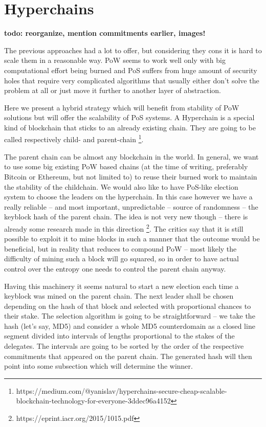 \section{Hyperchains}

\textbf{todo: reorganize, mention commitments earlier, images!}

The previous approaches had a lot to offer, but considering they cons it is hard
to scale them in a reasonable way. PoW seems to work well only with big
computational effort being burned and PoS suffers from huge amount of security
holes that require very complicated algorithms that usually either don't solve
the problem at all or just move it further to another layer of abstraction.

Here we present a hybrid strategy which will benefit from stability of PoW
solutions but will offer the scalability of PoS systems. A Hyperchain is a
special kind of blockchain that sticks to an already existing chain. They are
going to be called respectively child- and parent-chain
\footnote{https://medium.com/@yanislav/hyperchains-secure-cheap-scalable-blockchain-technology-for-everyone-3ddec96a4152}.

The parent chain can be almost any blockchain in the world. In general, we want
to use some big existing PoW based chains (at the time of writing, preferably
Bitcoin or Ethereum, but not limited to) to reuse their burned work to maintain
the stability of the childchain. We would also like to have
PoS-like election system to choose the leaders on the hyperchain. In this case
however we have a really reliable – and most important, unpredictable – source
of randomness – the keyblock hash of the parent chain. The idea is not very new
though – there is already some research made in this direction
\footnote{https://eprint.iacr.org/2015/1015.pdf}.
The critics say that it is still possible to exploit it to mine blocks in such a
manner that the outcome would be beneficial, but in reality that reduces to
compound PoW – most likely the difficulty of mining such a block will go
squared, so in order to have actual control over the entropy one needs to
control the parent chain anyway.

Having this machinery it seems natural to start a new election each time a
keyblock was mined on the parent chain. The next leader shall be chosen
depending on the hash of that block and selected with proportional chances to
their stake. The selection algorithm is going to be straightforward – we take
the hash (let's say, MD5) and consider a whole MD5 counterdomain as a closed
line segment divided into intervals of lengths proportional to the stakes of the
delegates. The intervals are going to be sorted by the order of the respective
commitments that appeared on the parent chain. The generated hash will then
point into some subsection which will determine the winner.

